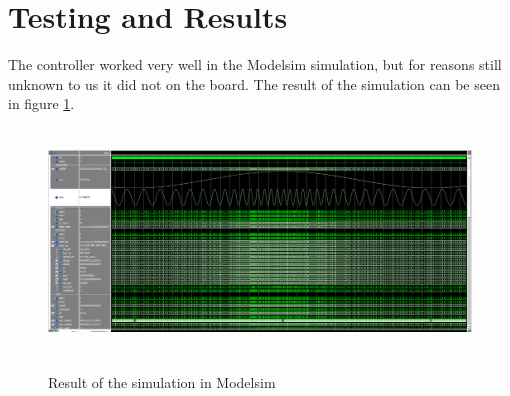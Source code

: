 \section{Testing and Results}

The controller worked very well in the Modelsim simulation, but for reasons still unknown to us it did not on the board. The result of the simulation can be seen in figure \ref{fig:sim}.

\begin{landscape}
	\begin{figure}[H] 
		\scalebox{1.7} %
		{\includegraphics[height=6cm]{images/modelsim_waveform-interpolated.png}} %
		\caption{Result of the simulation in Modelsim} 
		\label{fig:sim} %
	\end{figure} 
\end{landscape}
  
  